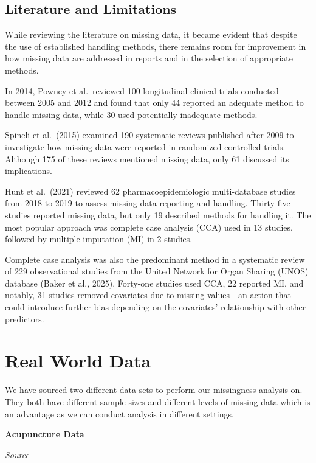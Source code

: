 \documentclass{article}
\begin{document}
\subsection{Literature and
Limitations}\label{literature-and-limitations}

While reviewing the literature on missing data, it became evident that
despite the use of established handling methods, there remains room for
improvement in how missing data are addressed in reports and in the
selection of appropriate methods.

In 2014, Powney et al.~reviewed 100 longitudinal clinical trials
conducted between 2005 and 2012 and found that only 44 reported an
adequate method to handle missing data, while 30 used potentially
inadequate methods.

Spineli et al.~(2015) examined 190 systematic reviews published after
2009 to investigate how missing data were reported in randomized
controlled trials. Although 175 of these reviews mentioned missing data,
only 61 discussed its implications.

Hunt et al.~(2021) reviewed 62 pharmacoepidemiologic multi-database
studies from 2018 to 2019 to assess missing data reporting and handling.
Thirty-five studies reported missing data, but only 19 described methods
for handling it. The most popular approach was complete case analysis
(CCA) used in 13 studies, followed by multiple imputation (MI) in 2
studies.

Complete case analysis was also the predominant method in a systematic
review of 229 observational studies from the United Network for Organ
Sharing (UNOS) database (Baker et al., 2025). Forty-one studies used
CCA, 22 reported MI, and notably, 31 studies removed covariates due to
missing values---an action that could introduce further bias depending
on the covariates' relationship with other predictors.

\newpage

\section{Real World Data}\label{real-world-data}

We have sourced two different data sets to perform our missingness
analysis on. They both have different sample sizes and different levels
of missing data which is an advantage as we can conduct analysis in
different settings.

\textbf{Acupuncture Data}

\emph{Source}
\end{document}
